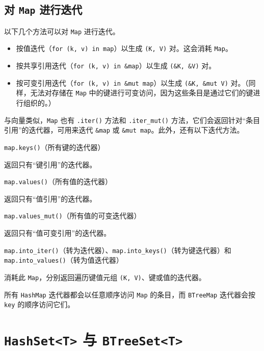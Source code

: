 \subsection{对 \texttt{Map} 进行迭代}

以下几个方法可以对 \texttt{Map} 进行迭代。

\begin{itemize}
\item 按值迭代（\texttt{for (k, v) in map}）以生成 \texttt{(K, V)} 对。这会消耗 \texttt{Map}。
\item 按共享引用迭代（\texttt{for (k, v) in \&map}）以生成 \texttt{(\&K, \&V)} 对。
\item 按可变引用迭代（\texttt{for (k, v) in \&mut map}）以生成 \texttt{(\&K, \&mut V)} 对。（同样，无法对存储在 \texttt{Map} 中的键进行可变访问，因为这些条目是通过它们的键进行组织的。）
\end{itemize}

与向量类似，\texttt{Map} 也有 \texttt{.iter()} 方法和 \texttt{.iter\_mut()} 方法，它们会返回针对“条目引用”的迭代器，可用来迭代 \texttt{\&map} 或 \texttt{\&mut map}。此外，还有以下迭代方法。

\begin{mySidenote}
\texttt{map.keys()}（所有键的迭代器）
\end{mySidenote}

返回只有“键引用”的迭代器。

\begin{mySidenote}
\texttt{map.values()}（所有值的迭代器）
\end{mySidenote}

返回只有“值引用”的迭代器。

\begin{mySidenote}
\texttt{map.values\_mut()}（所有值的可变迭代器）
\end{mySidenote}

返回只有“值可变引用”的迭代器。

\begin{myNote}
\texttt{map.into\_iter()}（转为迭代器）、\texttt{map.into\_keys()}（转为键迭代器）和 \texttt{map.into\_values()}（转为值迭代器）
\end{myNote}

消耗此 \texttt{Map}，分别返回遍历键值元组 \texttt{(K, V)}、键或值的迭代器。

所有 \texttt{HashMap} 迭代器都会以任意顺序访问 \texttt{Map} 的条目，而 \texttt{BTreeMap} 迭代器会按 \texttt{key} 的顺序访问它们。

\section{\texttt{HashSet<T>} 与 \texttt{BTreeSet<T>}}

